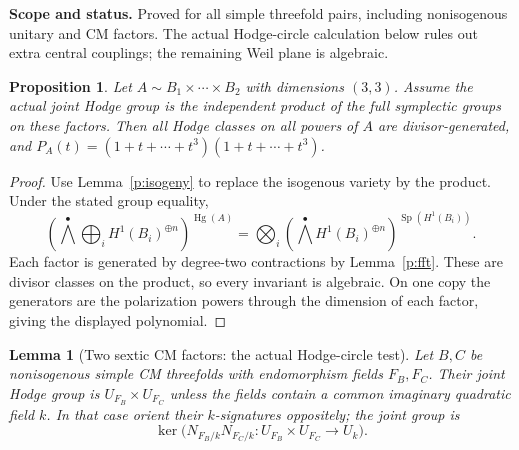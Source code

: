 \documentclass[11pt,reqno]{article}
\theoremstyle{emphasizedplain}
\newtheorem{lemma}[theorem]{Lemma}
\newtheorem{proposition}[theorem]{Proposition}
\theoremstyle{emphasizeddefinition}
\theoremstyle{emphasizeddefinition}
\DeclareMathOperator{\Hg}{Hg}
\DeclareMathOperator{\Sp}{Sp}
\newcommand{\status}[1]{%
  \par\nobreak\smallskip\noindent
  {\setlength{\fboxsep}{7pt}%
   \colorbox{ScopeBackground}{%
    \parbox{\dimexpr\linewidth-2\fboxsep\relax}{%
     \small\textbf{\textcolor{HeadingInk}{Scope and status.}} #1}}}%
  \par\nobreak\medskip}
\begin{document}
\status{Proved for all simple threefold pairs, including nonisogenous unitary
and CM factors. The actual Hodge-circle calculation below rules out
extra central couplings; the remaining Weil plane is algebraic.}
\begin{proposition}
Let $A\sim B_1\times\cdots\times B_{2}$ with dimensions
$(3,3)$. Assume the actual joint Hodge group is the
independent product of the full symplectic groups on these factors.
Then all Hodge classes on all powers of $A$ are divisor-generated,
and $P_A(t)=(1+t+\cdots+t^{3})(1+t+\cdots+t^{3})$.
\end{proposition}
\begin{proof}
Use Lemma~\ref{p:isogeny} to replace the isogenous variety by the product.
Under the stated group equality,
\[
 \left(\bigwedge^\bullet\bigoplus_i H^1(B_i)^{\oplus n}\right)^{\Hg(A)}
 =\bigotimes_i\left(\bigwedge^\bullet H^1(B_i)^{\oplus n}\right)^{\Sp(H^1(B_i))}.
\]
Each factor is generated by degree-two contractions by Lemma~\ref{p:fft}.
These are divisor classes on the product, so every invariant is algebraic.
On one copy the generators are the polarization powers through the
dimension of each factor, giving the displayed polynomial.
\end{proof}
\begin{lemma}[Two sextic CM factors: the actual Hodge-circle test]
\label{p:CMthreepair}
Let $B,C$ be nonisogenous simple CM threefolds with endomorphism fields
$F_B,F_C$. Their joint Hodge group is $U_{F_B}\times U_{F_C}$ unless
the fields contain a common imaginary quadratic field $k$.
In that case orient their $k$-signatures oppositely; the joint group is
\[
 \ker\bigl(N_{F_B/k}N_{F_C/k}:U_{F_B}\times U_{F_C}\longrightarrow U_k\bigr).
\]
\end{lemma}
\end{document}
